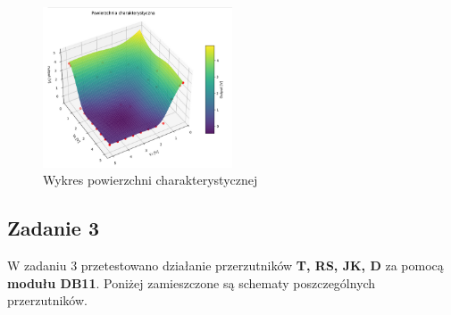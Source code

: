 \documentclass{article}
\begin{document}
\begin{figure}[h]
    \centering
    \includegraphics[width=0.5\textwidth]{powierzchnia.PNG}
    \caption{Wykres powierzchni charakterystycznej}
    \label{fig:moj_obrazek}
\end{figure}

\subsection{Zadanie 3}
W zadaniu 3 przetestowano działanie przerzutników \textbf{T, RS, JK, D} za pomocą \textbf{modułu DB11}. Poniżej zamieszczone są schematy poszczególnych przerzutników.
\end{document}
